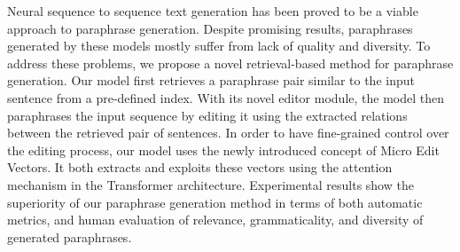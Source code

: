 Neural sequence to sequence text generation has been proved to be a viable approach to paraphrase generation. Despite promising results, paraphrases generated by these models mostly suffer from lack of quality and diversity. To address these problems, we propose a novel retrieval-based method for paraphrase generation. Our model first retrieves a paraphrase pair similar to the input sentence from a pre-defined index. With its novel editor module, the model then paraphrases the input sequence by editing it using the extracted relations between the retrieved pair of sentences. In order to have fine-grained control over the editing process, our model uses the newly introduced concept of Micro Edit Vectors. It both extracts and exploits these vectors using the attention mechanism in the Transformer architecture. Experimental results show the superiority of our paraphrase generation method in terms of both automatic metrics, and human evaluation of relevance, grammaticality, and diversity of generated paraphrases.
